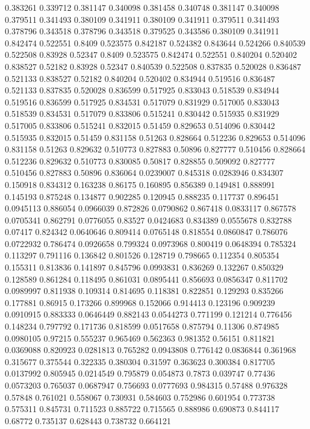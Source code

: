 0.383261 0.339712
0.381147 0.340098
0.381458 0.340748
0.381147 0.340098
0.379511 0.341493
0.380109 0.341911
0.380109 0.341911
0.379511 0.341493
0.378796 0.343518
0.378796 0.343518
0.379525 0.343586
0.380109 0.341911
0.842474 0.522551
0.8409 0.523575
0.842187 0.524382
0.843644 0.524266
0.840539 0.522508
0.83928 0.52347
0.8409 0.523575
0.842474 0.522551
0.840204 0.520402
0.838527 0.52182
0.83928 0.52347
0.840539 0.522508
0.837835 0.520028
0.836487 0.521133
0.838527 0.52182
0.840204 0.520402
0.834944 0.519516
0.836487 0.521133
0.837835 0.520028
0.836599 0.517925
0.833043 0.518539
0.834944 0.519516
0.836599 0.517925
0.834531 0.517079
0.831929 0.517005
0.833043 0.518539
0.834531 0.517079
0.833806 0.515241
0.830442 0.515935
0.831929 0.517005
0.833806 0.515241
0.832015 0.51459
0.829653 0.514096
0.830442 0.515935
0.832015 0.51459
0.831158 0.51263
0.828664 0.512236
0.829653 0.514096
0.831158 0.51263
0.829632 0.510773
0.827883 0.50896
0.827777 0.510456
0.828664 0.512236
0.829632 0.510773
0.830085 0.50817
0.828855 0.509092
0.827777 0.510456
0.827883 0.50896
0.836064 0.0239007
0.845318 0.0283946
0.834307 0.150918
0.834312 0.163238
0.86175 0.160895
0.856389 0.149481
0.888991 0.145193
0.875248 0.134877
0.902285 0.120945
0.888235 0.117737
0.896451 0.0945113
0.886054 0.0966039
0.872826 0.0790862
0.867418 0.0833117
0.867578 0.0705341
0.862791 0.0776055
0.83527 0.0424683
0.834389 0.0555678
0.832788 0.07417
0.824342 0.0640646
0.809414 0.0765148
0.818554 0.0860847
0.786076 0.0722932
0.786474 0.0926658
0.799324 0.0973968
0.800419 0.0648394
0.785324 0.113297
0.791116 0.136842
0.801526 0.128719
0.798665 0.112354
0.805354 0.155311
0.813836 0.141897
0.845796 0.0993831
0.836269 0.132267
0.850329 0.128589
0.861284 0.118495
0.861031 0.0895441
0.856693 0.0856347
0.811702 0.0989997
0.811938 0.109314
0.814695 0.118381
0.822851 0.129293
0.835266 0.177881
0.86915 0.173266
0.899968 0.152066
0.914413 0.123196
0.909239 0.0910915
0.883333 0.0646449
0.882143 0.0544273
0.771199 0.121214
0.776456 0.148234
0.797792 0.171736
0.818599 0.0517658
0.875794 0.11306
0.874985 0.0980105
0.97215 0.555237
0.965469 0.562363
0.981352 0.56151
0.811821 0.0369088
0.820923 0.0281813
0.765282 0.0943808
0.776142 0.0836844
0.361968 0.315677
0.375544 0.322335
0.380304 0.31597
0.363623 0.300384
0.817705 0.0137992
0.805945 0.0214549
0.795879 0.054873
0.7873 0.039747
0.77436 0.0573203
0.765037 0.0687947
0.756693 0.0777693
0.984315 0.57488
0.976328 0.57848
0.761021 0.558067
0.730931 0.584603
0.752986 0.601954
0.773738 0.575311
0.845731 0.711523
0.885722 0.715565
0.888986 0.690873
0.844117 0.68772
0.735137 0.628443
0.738732 0.664121
